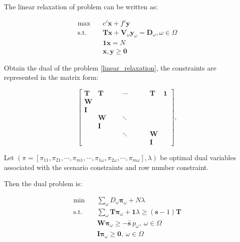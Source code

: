 The linear relaxation of problem can be written as:

\begin{equation}\label{linear_relaxation}
  \begin{aligned}
    \max \quad & c{'} \mathbf{x} + f{'} \mathbf{y} \\
    \text {s.t.} \quad & \mathbf{T} \mathbf{x} + \mathbf{V}_\omega \mathbf{y}_\omega = \mathbf{D}_\omega, \omega\in \Omega \\
    & \mathbf{1} \mathbf{x} = N \\
    & \mathbf{x}, \mathbf{y} \geq \mathbf{0}
  \end{aligned}
\end{equation}

Obtain the dual of the problem \eqref{linear_relaxation}, the constraints are represented in the matrix form:

$$
\left[\begin{array}{cccccccccc}
\mathbf{T} & \mathbf{T} & & & \cdots & & & & \mathbf{T}  & \mathbf{1} \\
\mathbf{W} & & & & & & & & & \\
\mathbf{I} & & & & & & & & & \\
 & \mathbf{W}& & & \ddots & & & & & \\
  & \mathbf{I} & & & & & & & &  \\
  & & & & \ddots & & & & \mathbf{W} & \\
  & &  & & & & & & \mathbf{I} &  
\end{array}\right],
$$

Let $(\pi=\left[\pi_{11}, \pi_{21},\cdots,\pi_{m 1}, \cdots, \pi_{1 \omega}, \pi_{2 \omega}, \cdots, \pi_{m \omega}\right],\lambda)$ be optimal dual variables associated with the scenario constraints and row number constraint.

Then the dual problem is:

\begin{align}
    \min \quad & \sum_{\omega} D_{\omega} \mathbf{\pi}_{\omega} + N \lambda \\
    \text {s.t.} \quad & \sum_{\omega} \mathbf{T} \mathbf{\pi}_{\omega} + \mathbf{1} \lambda \geq (\mathbf{s}-1)\mathbf{T} \\
    & \mathbf{W} \mathbf{\pi}_{\omega} \geq -\mathbf{\bar{s}}~p_{\omega}, ~\omega \in \Omega \label{W_dual} \\ 
    & \mathbf{I} \mathbf{\pi}_{\omega} \geq \mathbf{0}, ~\omega \in \Omega \label{I_dual} 
\end{align}

